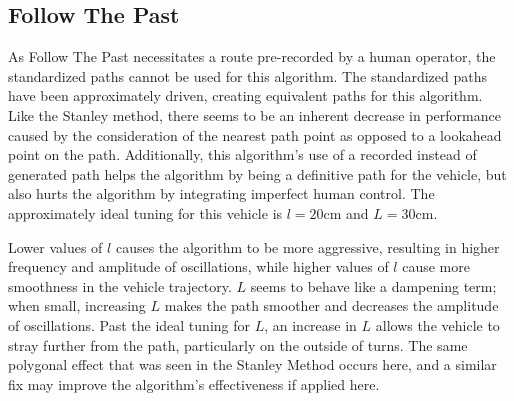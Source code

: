 \documentclass[12pt]{article}
\begin{document}
\begin{flushleft}
\begin{figure}[H]
\endminipage
\end{figure}

\subsection{Follow The Past}

As Follow The Past necessitates a route pre-recorded by a human operator, the standardized paths cannot be used for this algorithm. The standardized paths have been approximately driven, creating equivalent paths for this algorithm. Like the Stanley method, there seems to be an inherent decrease in performance caused by the consideration of the nearest path point as opposed to a lookahead point on the path. Additionally, this algorithm's use of a recorded instead of generated path helps the algorithm by being a definitive path for the vehicle, but also hurts the algorithm by integrating imperfect human control. The approximately ideal tuning for this vehicle is $l=20$cm and $L=30$cm.

Lower values of $l$ causes the algorithm to be more aggressive, resulting in higher frequency and amplitude of oscillations, while higher values of $l$ cause more smoothness in the vehicle trajectory. $L$ seems to behave like a dampening term; when small, increasing $L$ makes the path smoother and decreases the amplitude of oscillations. Past the ideal tuning for $L$, an increase in $L$ allows the vehicle to stray further from the path, particularly on the outside of turns. The same polygonal effect that was seen in the Stanley Method occurs here, and a similar fix may improve the algorithm's effectiveness if applied here.


\end{flushleft}
\end{document}
